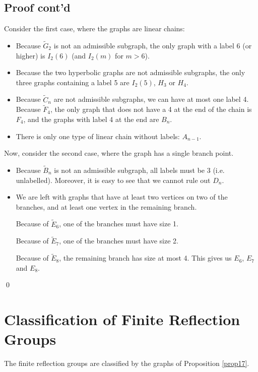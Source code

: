 \subsection{Proof cont'd}

Consider the first case, where the graphs are linear chains:

\begin{itemize}
\item
Because $\widetilde{G}_2$ is not an admissible subgraph, the only graph with a
label 6 (or higher) is $I_2(6)$ (and $I_2(m)$ for $m > 6$).
\item
Because the two hyperbolic graphs are not admissible subgraphs, the only three
graphs containing a label 5 are $I_2(5)$, $H_3$ or $H_4$.
\item
Because $\widetilde{C}_n$ are not admissible subgraphs, we can have at most
one label 4. Because $\widetilde{F}_4$, the only graph that does not have a 4
at the end of the chain is $F_4$, and the graphs with label 4 at the end are
$B_n$.
\item
There is only one type of linear chain without labels: $A_{n-1}$.
\end{itemize}

Now, consider the second case, where the graph has a single branch point.

\begin{itemize}
\item
Because $\widetilde{B}_n$ is not an admissible subgraph, all labels must be
3 (i.e. unlabelled). Moreover, it is easy to see that we cannot rule out
$D_n$.
\item
We are left with graphs that have at least two vertices on two of the branches,
and at least one vertex in the remaining branch.     %

Because of $\widetilde{E}_6$, one of the branches must have size 1.

Because of $\widetilde{E}_7$, one of the branches must have size 2.

Because of $\widetilde{E}_8$, the remaining branch has size at most 4. This
gives us $E_6$, $E_7$ and $E_8$.
\end{itemize}

\qed

\section{Classification of Finite Reflection Groups}

\begin{theorem} \label{thm18}
The finite reflection groups are classified by the graphs of Proposition
\ref{prop17}.
\end{theorem}


